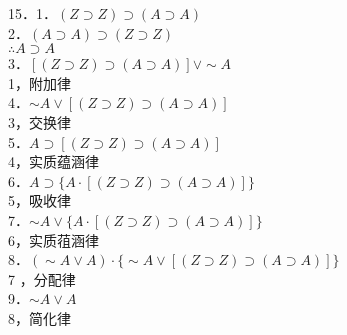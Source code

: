 15．1．$(Z \supset Z) \supset(A \supset A)$\\
2．$(A \supset A) \supset(Z \supset Z)$\\
$\therefore A \supset A$\\
3．$[(Z \supset Z) \supset(A \supset A)] \vee \sim A$\\
1，附加律\\
4．$\sim A \vee[(Z \supset Z) \supset(A \supset A)]$\\
3，交换律\\
5．$A \supset[(Z \supset Z) \supset(A \supset A)]$\\
4，实质蕴涵律\\
6．$A \supset\{A \cdot[(Z \supset Z) \supset(A \supset A)]\}$\\
5，吸收律\\
7．$\sim A \vee\{A \cdot[(Z \supset Z) \supset(A \supset A)]\}$\\
6，实质䓚涵律\\
8．$(\sim A \vee A) \cdot\{\sim A \vee[(Z \supset Z) \supset(A \supset A)]\}$\\
7 ，分配律\\
9．$\sim A \vee A$\\
8，简化律

